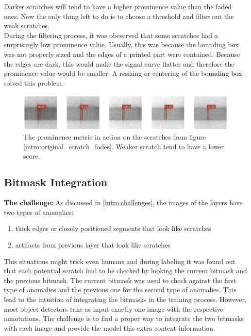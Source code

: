 Darker scratches will tend to have a higher prominence value than the faded ones. Now the only thing left to do is to choose a threshold and filter out the weak scratches. \\
During the filtering process, it was obeserved that some scratches had a surprisingly low prominence value. Usually, this was because the bounding box was not properly sized and the edges of a printed part were contained. Because the edges are dark, this would make the signal curve flatter and therefore the prominence value would be smaller. A resizing or centering of the bounding box solved this problem.

\begin{figure}[!h]
\centering
\captionsetup{justification=centering,margin=2cm}
\includegraphics[width=\columnwidth]{images/implementation/marked_scratch_fades}
\caption{The prominence metric in action on the scratches from figure \ref{intro:original_scratch_fades}. Weaker scratch tend to have a lower score.}
\label{impl:marked_scratch_fades}
\end{figure}

\subsection{Bitmask Integration}

\textbf{The challenge:}
As discussed in \ref{intro:challenges}, the images of the layers have two types of anomalies:
\begin{enumerate}
\item thick edges or closely positioned segments that look like scratches
\item artifacts from previous layer that look like scratches
\end{enumerate}

This situations might trick even humans and during labeling it was found out that each potential scratch had to be checked by looking the current bitmask and the previous bitmask. The current bitmask was used to check against the first type of anomalies and the previous one for the second type of anomalies. This lead to the intuition of integrating the bitmasks in the training process.
 However, most object detectors take as input exactly one image with the respective annotations. The challenge is to find a proper way to integrate the two bitmasks with each image and provide the model this extra context information.\\



